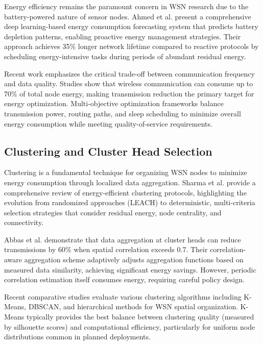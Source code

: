 \documentclass[12pt,a4paper]{article}
\begin{document}
Energy efficiency remains the paramount concern in WSN research due to the battery-powered nature of sensor nodes. Ahmed et al. \cite{Ahmed2023WSNEnergy} present a comprehensive deep learning-based energy consumption forecasting system that predicts battery depletion patterns, enabling proactive energy management strategies. Their approach achieves 35\% longer network lifetime compared to reactive protocols by scheduling energy-intensive tasks during periods of abundant residual energy.

Recent work emphasizes the critical trade-off between communication frequency and data quality. Studies show that wireless communication can consume up to 70\% of total node energy, making transmission reduction the primary target for energy optimization. Multi-objective optimization frameworks balance transmission power, routing paths, and sleep scheduling to minimize overall energy consumption while meeting quality-of-service requirements.

\subsection{Clustering and Cluster Head Selection}

Clustering is a fundamental technique for organizing WSN nodes to minimize energy consumption through localized data aggregation. Sharma et al. \cite{Sharma2024ClusteringWSN} provide a comprehensive review of energy-efficient clustering protocols, highlighting the evolution from randomized approaches (LEACH) to deterministic, multi-criteria selection strategies that consider residual energy, node centrality, and connectivity.

Abbas et al. \cite{Abbas2023EnergyAwareClustering} demonstrate that data aggregation at cluster heads can reduce transmissions by 60\% when spatial correlation exceeds 0.7. Their correlation-aware aggregation scheme adaptively adjusts aggregation functions based on measured data similarity, achieving significant energy savings. However, periodic correlation estimation itself consumes energy, requiring careful policy design.

Recent comparative studies evaluate various clustering algorithms including K-Means, DBSCAN, and hierarchical methods for WSN spatial organization. K-Means typically provides the best balance between clustering quality (measured by silhouette scores) and computational efficiency, particularly for uniform node distributions common in planned deployments.
\end{document}
